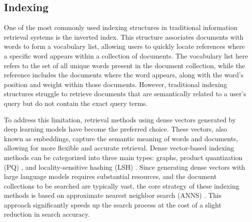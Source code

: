\subsection{Indexing}
One of the most commonly used indexing structures in traditional information retrieval systems is the inverted index. This structure associates documents with words to form a vocabulary list, allowing users to quickly locate references where a specific word appears within a collection of documents. The vocabulary list here refers to the set of all unique words present in the document collection, while the reference includes the documents where the word appears, along with the word's position and weight within those documents. However, traditional indexing structures struggle to retrieve documents that are semantically related to a user's query but do not contain the exact query terms.

To address this limitation, retrieval methods using dense vectors generated by deep learning models have become the preferred choice. These vectors, also known as embeddings, capture the semantic meaning of words and documents, allowing for more flexible and accurate retrieval. Dense vector-based indexing methods can be categorized into three main types: graphs, product quantization (PQ) \cite{jégou2011product}, and locality-sensitive hashing (LSH) \cite{datar2004localitysensitive}. Since generating dense vectors with large language models requires substantial resources, and the document collections to be searched are typically vast, the core strategy of these indexing methods is based on approximate nearest neighbor search (ANNS) \cite{DBLP:journals/jacm/AryaMNSW98}. This approach significantly speeds up the search process at the cost of a slight reduction in search accuracy. 

